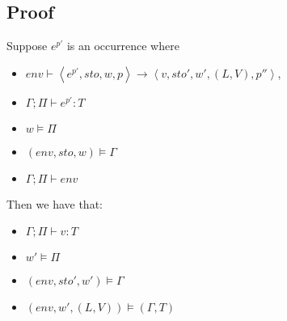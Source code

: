 \documentclass[../../master.tex]{subfiles}
\begin{document}
\subsection{Proof}
\begin{theorem}
	Suppose $e^{p'}$ is an occurrence where
	\begin{itemize}
		\item $env\vdash\left\langle e^{p'},sto,w,p\right\rangle\rightarrow\left\langle v,sto',w',(L,V),p''\right\rangle$,
		\item $\Gamma;\Pi\vdash e^{p'} : T$
		\item $w\models\Pi$
		\item $(env,sto,w)\models\Gamma$
		\item $\Gamma;\Pi\vdash env$
	\end{itemize}
	Then we have that:
	\begin{itemize}
		\item $\Gamma;\Pi\vdash v:T$
		\item $w'\models\Pi$
		\item $(env,sto',w')\models\Gamma$
		\item $(env,w',(L,V))\models(\Gamma,T)$
	\end{itemize}
\end{theorem}
\end{document}
